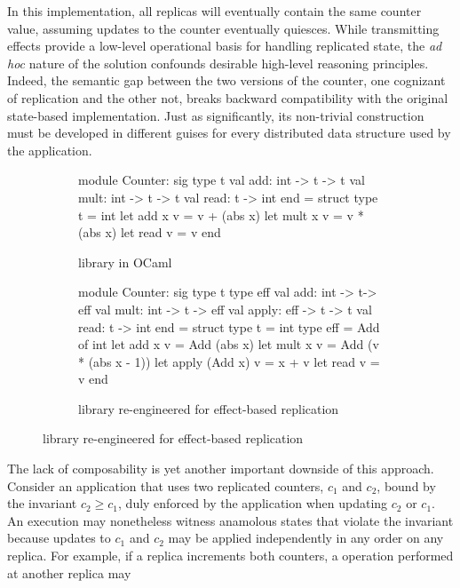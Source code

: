 In this implementation, all replicas will eventually contain the same
counter value, assuming updates to the counter eventually quiesces.
While transmitting effects provide a low-level operational basis for
handling replicated state, the \emph{ad hoc} nature of the solution
confounds desirable high-level reasoning principles.  Indeed, the
semantic gap between the two versions of the counter, one cognizant of
replication and the other not, breaks backward compatibility with the
original state-based implementation.  Just as significantly, its
non-trivial construction must be developed in different guises for
every distributed data structure used by the application.
\begin{figure}
\begin{subfigure}[b]{0.4\textwidth}
  \begin{ocaml}
    module Counter: sig
      type t
      val add: int -> t -> t
      val mult: int -> t -> t
      val read: t -> int
    end = struct
      type t = int
      let add x v = v + (abs x)
      let mult x v = v * (abs x)
      let read v = v
    end
  \end{ocaml}
\caption{ library in OCaml}
\label{fig:counter-adt}
\end{subfigure}
\begin{subfigure}[b]{0.56\textwidth}
  \begin{ocaml}
    module Counter: sig
      type t
      type eff
      val add: int -> t-> eff
      val mult: int -> t -> eff
      val apply: eff -> t -> t
      val read: t -> int
    end = struct
      type t = int
      type eff = Add of int
      let add x v = Add (abs x)
      let mult x v = Add (v * (abs x - 1))
      let apply (Add x) v = x + v
      let read v = v
    end
  \end{ocaml}
\caption{ library re-engineered for effect-based replication}
\label{fig:counter-rdt}
\end{subfigure}
\end{figure}
The lack of composability is yet another important downside of this
approach.  Consider an application that uses two replicated counters,
$c_1$ and $c_2$, bound by the invariant $c_2 \ge c_1$, duly enforced
by the application when updating $c_2$ or $c_1$.  An execution may
nonetheless witness anamolous states that violate the invariant
because updates to $c_1$ and $c_2$ may be applied independently in any
order on any replica.  For example, if a replica increments both
counters, a  operation performed at another replica may
